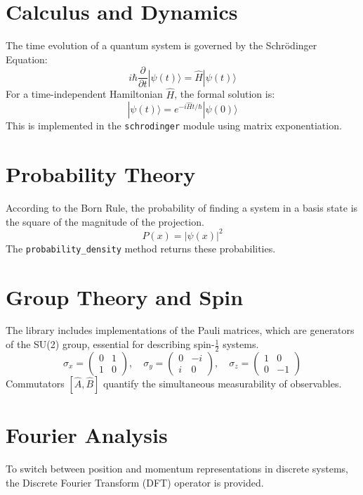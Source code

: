 \documentclass{article}
\begin{document}
\section{Calculus and Dynamics}
The time evolution of a quantum system is governed by the Schrödinger Equation:
\begin{equation}
    i\hbar \frac{\partial}{\partial t}|\psi(t)\rangle = \hat{H}|\psi(t)\rangle
\end{equation}
For a time-independent Hamiltonian $\hat{H}$, the formal solution is:
\begin{equation}
    |\psi(t)\rangle = e^{-i\hat{H}t/\hbar}|\psi(0)\rangle
\end{equation}
This is implemented in the \texttt{schrodinger} module using matrix exponentiation.

\section{Probability Theory}
According to the Born Rule, the probability of finding a system in a basis state is the square of the magnitude of the projection.
\begin{equation}
    P(x) = |\psi(x)|^2
\end{equation}
The \texttt{probability\_density} method returns these probabilities.

\section{Group Theory and Spin}
The library includes implementations of the Pauli matrices, which are generators of the SU(2) group, essential for describing spin-$\frac{1}{2}$ systems.
\begin{equation}
    \sigma_x = \begin{pmatrix} 0 & 1 \\ 1 & 0 \end{pmatrix}, \quad
    \sigma_y = \begin{pmatrix} 0 & -i \\ i & 0 \end{pmatrix}, \quad
    \sigma_z = \begin{pmatrix} 1 & 0 \\ 0 & -1 \end{pmatrix}
\end{equation}
Commutators $[\hat{A}, \hat{B}]$ quantify the simultaneous measurability of observables.

\section{Fourier Analysis}
To switch between position and momentum representations in discrete systems, the Discrete Fourier Transform (DFT) operator is provided.
\end{document}
